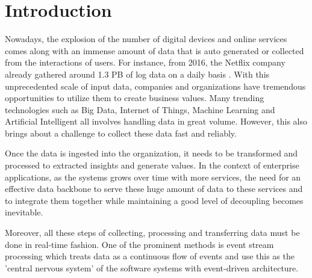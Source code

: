 \chapter{Introduction} \label{chap:intro}
Nowadays, the explosion of the number of digital devices and online services comes along with an immense amount of data that is auto generated or collected from the interactions of users. For instance, from 2016, the Netflix company already gathered around 1.3 PB of log data on a daily basis \cite{netflixpipeline}. With this unprecedented scale of input data, companies and organizations have tremendous opportunities to utilize them to create business values. Many trending technologies such as Big Data, Internet of Things, Machine Learning and Artificial Intelligent all involves handling data in great volume. However, this also brings about a challenge to collect these data fast and reliably.


Once the data is ingested into the organization, it needs to be transformed  and processed to extracted insights and generate values. In the context of enterprise applications, as the systems grows over time with more services, the need for an effective data backbone to serve these huge amount of data to these services and to integrate them together while maintaining a good level of decoupling becomes inevitable.

Moreover, all these steps of collecting, processing and transferring data must be done in real-time fashion. One of the prominent methods is event stream processing which treats data as a continuous flow of events and use this as the 'central nervous system' of the software systems with event-driven architecture.

